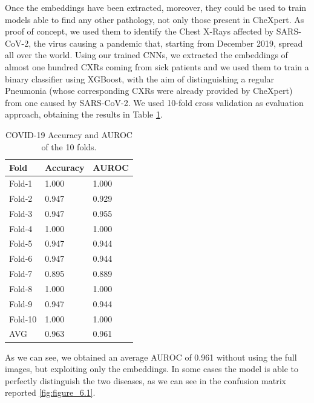 \vspace{5mm}

Once the embeddings have been extracted, moreover, they could be used to train models able to find any other pathology, not only those present in CheXpert. As proof of concept, we used them to identify the Chest X-Rays affected by SARS-CoV-2, the virus causing a pandemic that, starting from December 2019, spread all over the world. Using our trained \acp{CNN}, we extracted the embeddings of almost one hundred \acp{CXR} coming from sick patients and we used them to train a binary classifier using XGBoost, with the aim of distinguishing a regular Pneumonia (whose corresponding \acp{CXR} were already provided by CheXpert) from one caused by SARS-CoV-2. We used 10-fold cross validation as evaluation approach, obtaining the results in Table \ref{table:table_6.1}.

\vspace{5mm}

\begin{table}[h!]
\centering
\begin{tabular}{|l|l|l|} 
\hline
\textbf{Fold} & \textbf{Accuracy} & \textbf{AUROC} \\
\hline
Fold-1  &1.000 & 1.000\\ \hline
Fold-2  &0.947 & 0.929\\ \hline
Fold-3  &0.947 & 0.955\\\hline
Fold-4  &1.000 & 1.000\\\hline
Fold-5  &0.947 & 0.944\\\hline
Fold-6  &0.947 & 0.944\\\hline
Fold-7  &0.895 & 0.889\\\hline
Fold-8  &1.000 & 1.000\\\hline
Fold-9  &0.947 & 0.944\\\hline
Fold-10 &1.000 & 1.000\\\hline

\rowcolor[rgb]{0.851,0.851,0.851}AVG & 0.963 & 0.961\\
\hline
\end{tabular}

\caption[COVID-19 results]{COVID-19 Accuracy and AUROC of the 10 folds.}
\label{table:table_6.1}
\end{table}

\vspace{3mm}

As we can see, we obtained an average AUROC of 0.961 without using the full images, but exploiting only the embeddings. In some cases the model is able to perfectly distinguish the two diseases, as we can see in the confusion matrix reported \ref{fig:figure_6.1}.

